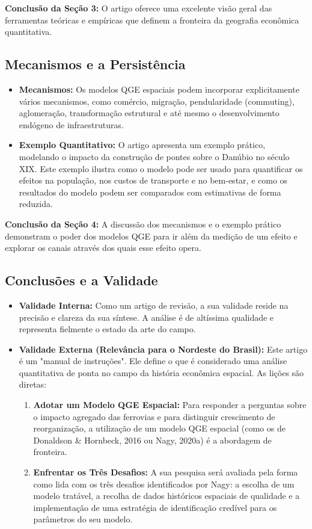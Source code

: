 \documentclass[12pt, a4paper]{article}
\begin{document}
\noindent\textbf{Conclusão da Seção 3:} O artigo oferece uma excelente visão geral das ferramentas teóricas e empíricas que definem a fronteira da geografia econômica quantitativa.

\subsection{Mecanismos e a Persistência}

\begin{itemize}
    \item \textbf{Mecanismos:} Os modelos QGE espaciais podem incorporar explicitamente vários mecanismos, como comércio, migração, pendularidade (commuting), aglomeração, transformação estrutural e até mesmo o desenvolvimento endógeno de infraestruturas.
    \item \textbf{Exemplo Quantitativo:} O artigo apresenta um exemplo prático, modelando o impacto da construção de pontes sobre o Danúbio no século XIX. Este exemplo ilustra como o modelo pode ser usado para quantificar os efeitos na população, nos custos de transporte e no bem-estar, e como os resultados do modelo podem ser comparados com estimativas de forma reduzida.
\end{itemize}

\noindent\textbf{Conclusão da Seção 4:} A discussão dos mecanismos e o exemplo prático demonstram o poder dos modelos QGE para ir além da medição de um efeito e explorar os canais através dos quais esse efeito opera.

\subsection{Conclusões e a Validade}
\begin{itemize}
    \item \textbf{Validade Interna:} Como um artigo de revisão, a sua validade reside na precisão e clareza da sua síntese. A análise é de altíssima qualidade e representa fielmente o estado da arte do campo.
    \item \textbf{Validade Externa (Relevância para o Nordeste do Brasil):} Este artigo é um "manual de instruções". Ele define o que é considerado uma análise quantitativa de ponta no campo da história econômica espacial. As lições são diretas:
        \begin{enumerate}
            \item \textbf{Adotar um Modelo QGE Espacial:} Para responder a perguntas sobre o impacto agregado das ferrovias e para distinguir crescimento de reorganização, a utilização de um modelo QGE espacial (como os de Donaldson \& Hornbeck, 2016 ou Nagy, 2020a) é a abordagem de fronteira.
            \item \textbf{Enfrentar os Três Desafios:} A sua pesquisa será avaliada pela forma como lida com os três desafios identificados por Nagy: a escolha de um modelo tratável, a recolha de dados históricos espaciais de qualidade e a implementação de uma estratégia de identificação credível para os parâmetros do seu modelo.
        \end{enumerate}
\end{itemize}
\end{document}
